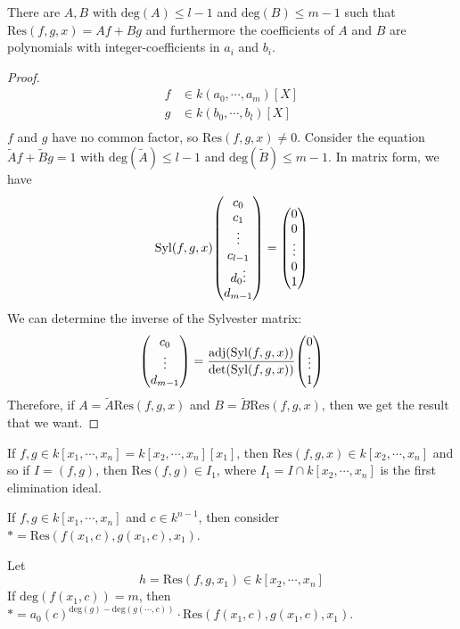 \documentclass[a4paper,twoside,master.tex]{subfiles}
\begin{document}
\begin{claim}
    There are $ A, B $ with $ \text{deg}(A) \leq l-1 $ and $ \text{deg}(B) \leq m-1 $ such that $ \text{Res}(f,g,x) = Af + Bg $ and furthermore the coefficients of $ A $ and $ B $ are polynomials with integer-coefficients in $ a_i $ and $ b_i $.
\end{claim}
\begin{proof}
    \begin{align}
        f &\in k(a_0, \cdots, a_m)[X] \\
        g &\in k(b_0, \cdots, b_l)[X] \\
    \end{align}
    $ f $ and $ g $ have no common factor, so $ \text{Res}(f,g,x) \neq 0 $. Consider the equation $ \tilde{A} f + \tilde{B} g = 1 $ with $ \text{deg}(\tilde{A}) \leq l-1 $ and $ \text{deg}(\tilde{B}) \leq m-1 $. In matrix form, we have
    \begin{equation}
        \text{Syl}(f,g,x) \mqty(c_0 \\ c_1 \\ \vdots \\ c_{l-1} \\ d_0 \vdots \\ d_{m-1}) = \mqty(0 \\ 0 \\ \vdots \\ 0 \\ 1)
    \end{equation}
    We can determine the inverse of the Sylvester matrix:
    \begin{equation}
        \mqty(c_0 \\ \vdots \\ d_{m-1}) = \frac{\text{adj}(\text{Syl}(f,g,x))}{\det(\text{Syl}(f,g,x))} \mqty(0 \\ \vdots \\ 1)
    \end{equation}
    Therefore, if $ A = \tilde{A} \text{Res}(f,g,x) $ and $ B = \tilde{B} \text{Res}(f,g,x) $, then we get the result that we want.
\end{proof}
\begin{claim}
    If $ f,g \in k[x_1, \cdots, x_n] = k[x_2, \cdots, x_n][x_1] $, then $ \text{Res}(f,g,x) \in k[x_2, \cdots, x_n] $ and so if $ I = (f,g) $, then $ \text{Res}(f,g) \in I_1 $, where $ I_1 = I \cap k[x_2, \cdots, x_n] $ is the first elimination ideal.
\end{claim}
\begin{claim}
    If $ f,g \in k[x_1, \cdots, x_n] $ and $ c \in k^{n-1} $, then consider $ \ast = \text{Res}(f(x_1, c), g(x_1, c), x_1) $.

    Let
    \begin{equation}
        h = \text{Res}(f,g, x_1) \in k[x_2, \cdots, x_n]
    \end{equation}
    If $ \text{deg}(f(x_1, c)) = m $, then $ \ast = a_0(c)^{\text{deg}(g) - \text{deg}(g(\cdots, c))} \cdot \text{Res}(f(x_1, c), g(x_1, c), x_1) $.
\end{claim}
\end{document}
